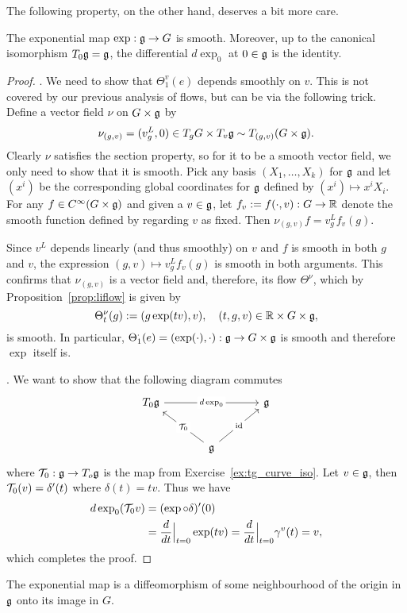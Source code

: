 The following property, on the other hand, deserves a bit more care.
\begin{theorem}
	The exponential map $\exp:\mathfrak{g}\to G$ is smooth.
	Moreover, up to the canonical isomorphism $T_0\mathfrak{g} = \mathfrak{g}$, the differential $d\exp_0$ at $0\in\mathfrak{g}$ is the identity.
\end{theorem}
\begin{proof}
	. We need to show that $\Theta_1^v(e)$ depends smoothly on $v$.
	This is not covered by our previous analysis of flows, but can be via the following trick.
	Define a vector field $\nu$ on $G\times\mathfrak{g}$ by
	\begin{equation}
		\nu_{(g,v)} = (v^L_g, 0)\in T_gG\times T_v\mathfrak{g} \sim T_{(g,v)}(G\times \mathfrak{g}).
	\end{equation}
	Clearly $\nu$ satisfies the section property, so for it to be a smooth vector field, we only need to show that it is smooth.
	Pick any basis $(X_1,\ldots,X_k)$ for $\mathfrak{g}$ and let $(x^i)$ be the corresponding global coordinates for $\mathfrak{g}$ defined by $(x^i)\mapsto x^i X_i$.
	For any $f\in C^\infty(G\times\mathfrak{g})$ and given a $v\in\mathfrak{g}$, let $f_v:= f(\cdot, v):G\to\mathbb{R}$ denote the smooth function defined by regarding $v$ as fixed.
	Then $\nu_{(g,v)}f = v^L_g f_v(g)$.

	Since $v^L$ depends linearly (and thus smoothly) on $v$ and $f$ is smooth in both $g$ and $v$, the expression $(g,v)\mapsto  v^L_g f_v(g)$ is smooth in both arguments. This confirms that $\nu_{(g,v)}$ is a vector field and, therefore, its flow $\Theta^\nu$, which by Proposition~\ref{prop:liflow} is given by
	\begin{equation}
		\Theta^\nu_t(g) := (g \exp(tv), v), \quad (t,g,v)\in\mathbb{R}\times G\times\mathfrak{g},
	\end{equation}
	is smooth. In particular, $\Theta^\cdot_1(e)= (\exp(\cdot), \cdot): \mathfrak{g}\to G\times\mathfrak{g}$ is smooth and therefore $\exp$ itself is.

	. We want to show that the following diagram commutes
	\begin{equation}\nonumber
		\begin{tikzcd}[row sep=large, column sep=large]
			T_0\fg \arrow[rr, "d\exp_0" description] & & \fg \\
			& \fg \arrow[ul, "\cT_0" description] \arrow[ur, "\id" description] &
		\end{tikzcd}
	\end{equation}
	where $\mathcal{T}_0:\mathfrak{g}\to T_o\mathfrak{g}$ is the map from Exercise~\ref{ex:tg_curve_iso}.
	Let $v\in\mathfrak{g}$, then $\mathcal{T}_0(v) = \delta'(t)$ where $\delta(t) = tv$.
	Thus we have
	\begin{align}
		d\exp_0 (\mathcal{T}_0 v) & = (\exp \circ \delta)'(0)          \\
		                  & = \frac{d}{dt}\Big|_{t=0} \exp(tv)
		= \frac{d}{dt}\Big|_{t=0} \gamma^v(t)
		= v,
	\end{align}
	which completes the proof.
\end{proof}
\begin{corollary}
	The exponential map is a diffeomorphism of some neighbourhood of the origin in $\mathfrak{g}$ onto its image in $G$.
\end{corollary}

